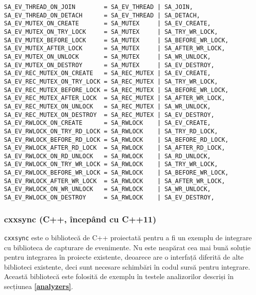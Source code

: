 \begin{lstlisting}[caption=Tipurile de evenimente pentru primitivele de
                           sincronizare, label=code:syan-event-types]
SA_EV_THREAD_ON_JOIN        = SA_EV_THREAD | SA_JOIN,
SA_EV_THREAD_ON_DETACH      = SA_EV_THREAD | SA_DETACH,
SA_EV_MUTEX_ON_CREATE       = SA_MUTEX     | SA_EV_CREATE,
SA_EV_MUTEX_ON_TRY_LOCK     = SA_MUTEX     | SA_TRY_WR_LOCK,
SA_EV_MUTEX_BEFORE_LOCK     = SA_MUTEX     | SA_BEFORE_WR_LOCK,
SA_EV_MUTEX_AFTER_LOCK      = SA_MUTEX     | SA_AFTER_WR_LOCK,
SA_EV_MUTEX_ON_UNLOCK       = SA_MUTEX     | SA_WR_UNLOCK,
SA_EV_MUTEX_ON_DESTROY      = SA_MUTEX     | SA_EV_DESTROY,
SA_EV_REC_MUTEX_ON_CREATE   = SA_REC_MUTEX | SA_EV_CREATE,
SA_EV_REC_MUTEX_ON_TRY_LOCK = SA_REC_MUTEX | SA_TRY_WR_LOCK,
SA_EV_REC_MUTEX_BEFORE_LOCK = SA_REC_MUTEX | SA_BEFORE_WR_LOCK,
SA_EV_REC_MUTEX_AFTER_LOCK  = SA_REC_MUTEX | SA_AFTER_WR_LOCK,
SA_EV_REC_MUTEX_ON_UNLOCK   = SA_REC_MUTEX | SA_WR_UNLOCK,
SA_EV_REC_MUTEX_ON_DESTROY  = SA_REC_MUTEX | SA_EV_DESTROY,
SA_EV_RWLOCK_ON_CREATE      = SA_RWLOCK    | SA_EV_CREATE,
SA_EV_RWLOCK_ON_TRY_RD_LOCK = SA_RWLOCK    | SA_TRY_RD_LOCK,
SA_EV_RWLOCK_BEFORE_RD_LOCK = SA_RWLOCK    | SA_BEFORE_RD_LOCK,
SA_EV_RWLOCK_AFTER_RD_LOCK  = SA_RWLOCK    | SA_AFTER_RD_LOCK,
SA_EV_RWLOCK_ON_RD_UNLOCK   = SA_RWLOCK    | SA_RD_UNLOCK,
SA_EV_RWLOCK_ON_TRY_WR_LOCK = SA_RWLOCK    | SA_TRY_WR_LOCK,
SA_EV_RWLOCK_BEFORE_WR_LOCK = SA_RWLOCK    | SA_BEFORE_WR_LOCK,
SA_EV_RWLOCK_AFTER_WR_LOCK  = SA_RWLOCK    | SA_AFTER_WR_LOCK,
SA_EV_RWLOCK_ON_WR_UNLOCK   = SA_RWLOCK    | SA_WR_UNLOCK,
SA_EV_RWLOCK_ON_DESTROY     = SA_RWLOCK    | SA_EV_DESTROY,
\end{lstlisting}

\subsubsection{cxxsync (C++, începând cu C++11)}
\lstinline{cxxsync} este o bibliotecă de C++ proiectată pentru a fi un
exemplu de integrare cu biblioteca de capturare de evenimente. Nu este
neapărat cea mai bună soluție pentru integrarea în proiecte existente,
deoarece are o interfață diferită de alte biblioteci existente, deci
sunt necesare schimbări în codul sursă pentru integrare. Această
bibliotecă este folosită de exemplu în testele analizorilor descriși în
secțiunea \textbf{\ref{analyzers}}.

